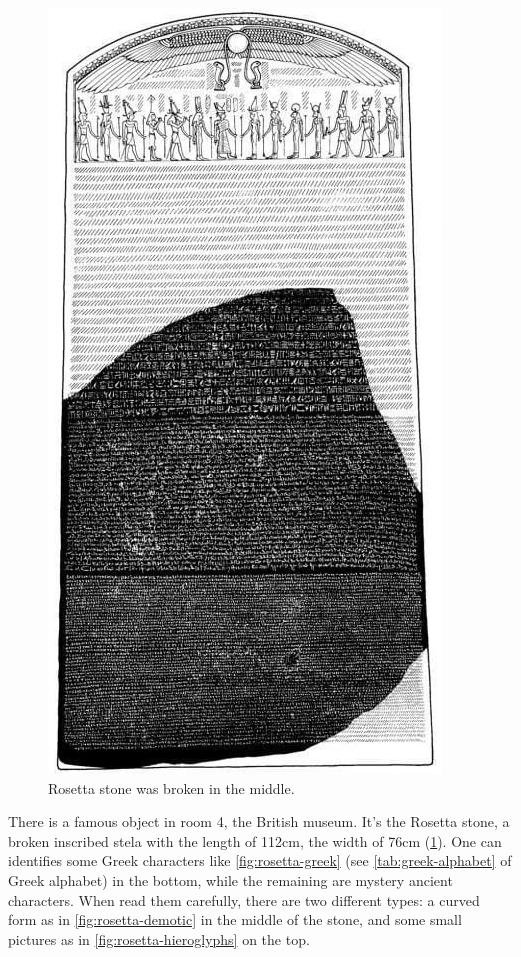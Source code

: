 \documentclass[b5paper]{article}
\begin{document}
\begin{figure}[htbp]
 \centering
 \includegraphics[scale=0.5]{img/Rosetta-stone-recons}
 \caption{Rosetta stone was broken in the middle.}
 \label{fig:rosetta-stone-recons}
\end{figure}

There is a famous object in room 4, the British museum. It's the Rosetta stone, a broken inscribed stela with the length of 112cm, the width of 76cm (\cref{fig:rosetta-stone-recons}). One can identifies some Greek characters like \cref{fig:rosetta-greek} (see \cref{tab:greek-alphabet} of Greek alphabet) in the bottom, while the remaining are mystery ancient characters. When read them carefully, there are two different types: a curved form as in \cref{fig:rosetta-demotic} in the middle of the stone, and some small pictures as in \cref{fig:rosetta-hieroglyphs} on the top.
\end{document}
